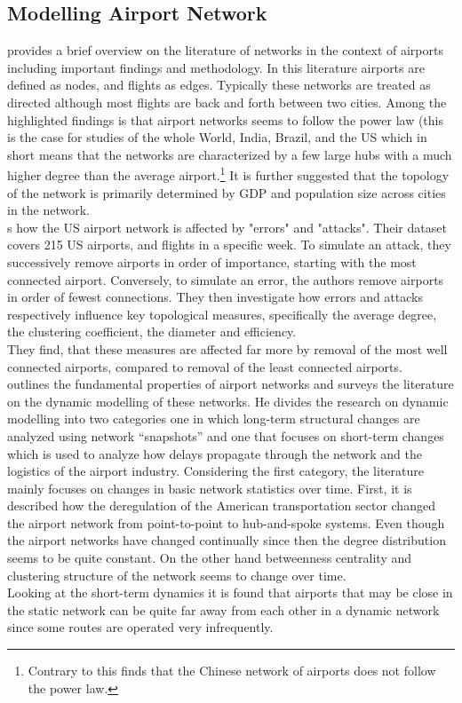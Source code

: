 \subsection{Modelling Airport Network}
\citet[pp. 41-42]{costa2011analyzing} provides a brief overview on the literature of networks in the context of airports including important findings and methodology. In this literature airports are defined as nodes, and flights as edges. Typically these networks are treated as directed although most flights are back and forth between two cities. Among the highlighted findings is that airport networks seems to follow the power law (this is the case for studies of the whole World, India, Brazil, and the US which in short means that the networks are characterized by a few large hubs with a much higher degree than the average airport.\footnote{Contrary to this \citet{he2004statistics} finds that the Chinese network of airports does not follow the power law.} It is further suggested that the topology of the network is primarily determined by GDP and population size across cities in the network. \\
\citet{chi2004structural} s how the US airport network is affected by "errors" and "attacks". Their dataset covers 215 US airports, and flights in a specific week. To simulate an attack, they successively remove airports in order of importance, starting with the most connected airport. Conversely, to simulate an error, the authors remove airports in order of fewest connections. They then investigate how errors and attacks respectively influence key topological measures, specifically the average degree, the clustering coefficient, the diameter and efficiency. \\
They find, that these measures are affected far more by removal of the most well connected airports, compared to removal of the least connected airports. \\
\citet{rocha2017dynamics} outlines the fundamental properties of airport networks and surveys the literature on the dynamic modelling of these networks. He divides the research on dynamic modelling into two categories one in which long-term structural changes are analyzed using network ``snapshots'' and one that focuses on short-term changes which is used to analyze how delays propagate through the network and the logistics of the airport industry. Considering the first category, the literature mainly focuses on changes in basic network statistics over time. First, it is described how the deregulation of the American transportation sector changed the airport network from point-to-point to hub-and-spoke systems. Even though the airport networks have changed continually since then the degree distribution seems to be quite constant. On the other hand betweenness centrality and clustering structure of the network seems to change over time. \\
Looking at the short-term dynamics it is found that airports that may be close in the static network can be quite far away from each other in a dynamic network since some routes are operated very infrequently.  


 